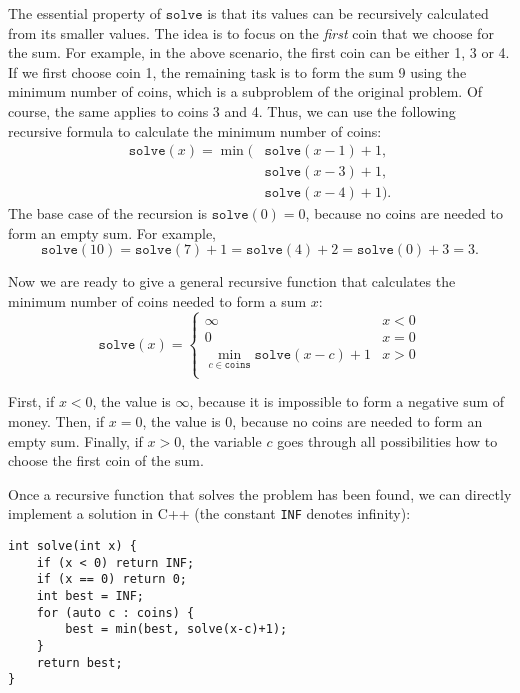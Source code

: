 The essential property of $\texttt{solve}$ is
that its values can be
recursively calculated from its smaller values.
The idea is to focus on the \emph{first}
coin that we choose for the sum.
For example, in the above scenario,
the first coin can be either 1, 3 or 4.
If we first choose coin 1,
the remaining task is to form the sum 9
using the minimum number of coins,
which is a subproblem of the original problem.
Of course, the same applies to coins 3 and 4.
Thus, we can use the following recursive formula
to calculate the minimum number of coins:
\begin{equation*}
\begin{split}
\texttt{solve}(x) = \min( & \texttt{solve}(x-1)+1, \\
                           & \texttt{solve}(x-3)+1, \\
                           & \texttt{solve}(x-4)+1).
\end{split}
\end{equation*}
The base case of the recursion is $\texttt{solve}(0)=0$,
because no coins are needed to form an empty sum.
For example,
\[ \texttt{solve}(10) = \texttt{solve}(7)+1 = \texttt{solve}(4)+2 = \texttt{solve}(0)+3 = 3.\]

Now we are ready to give a general recursive function
that calculates the minimum number of
coins needed to form a sum $x$:
\begin{equation*}
    \texttt{solve}(x) = \begin{cases}
               \infty               & x < 0\\
               0               & x = 0\\
               \min_{c \in \texttt{coins}} \texttt{solve}(x-c)+1 & x > 0 \\
           \end{cases}
\end{equation*}

First, if $x<0$, the value is $\infty$,
because it is impossible to form a negative
sum of money.
Then, if $x=0$, the value is $0$,
because no coins are needed to form an empty sum.
Finally, if $x>0$, the variable $c$ goes through
all possibilities how to choose the first coin
of the sum.

Once a recursive function that solves the problem
has been found,
we can directly implement a solution in C++
(the constant \texttt{INF} denotes infinity):

\begin{lstlisting}
int solve(int x) {
    if (x < 0) return INF;
    if (x == 0) return 0;
    int best = INF;
    for (auto c : coins) {
        best = min(best, solve(x-c)+1);
    }
    return best;
}
\end{lstlisting}

